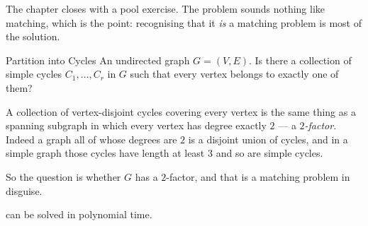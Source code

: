 The chapter closes with a pool exercise. The problem sounds nothing like
matching, which is the point: recognising that it \emph{is} a matching problem
is most of the solution.

\begin{probdef}{Partition into Cycles}
  \instance An undirected graph $G = (V,E)$.
  \question Is there a collection of simple cycles $C_1, \ldots, C_r$ in $G$
  such that every vertex belongs to exactly one of them?
\end{probdef}

A collection of vertex-disjoint cycles covering every vertex is the same thing
as a spanning subgraph in which every vertex has degree exactly $2$ --- a
\emph{$2$-factor}. Indeed a graph all of whose degrees are $2$ is a disjoint
union of cycles, and in a simple graph those cycles have length at least $3$ and
so are simple cycles.

So the question is whether $G$ has a $2$-factor, and that is a matching problem
in disguise.

\begin{theorem}\label{thm:matching-two-factor}
 can be solved in polynomial time.
\end{theorem}

